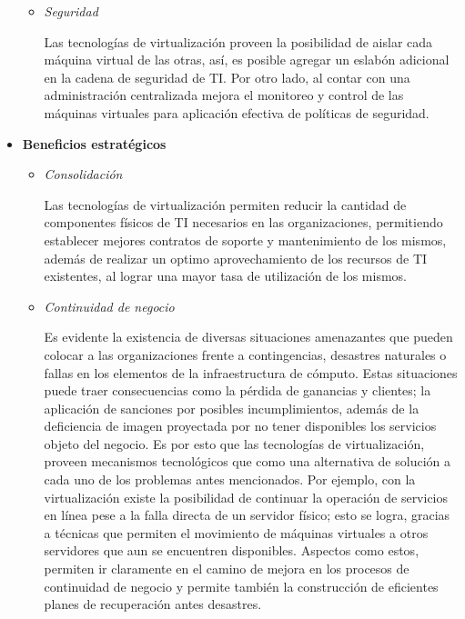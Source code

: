 \begin{itemize}
\begin{itemize}
		\item \textit{Seguridad}\vspace{3mm}
		
		Las tecnologías de virtualización proveen la posibilidad de aislar cada máquina virtual de las otras, así, es posible agregar un eslabón adicional en la cadena de seguridad de TI. Por otro lado, al contar con una administración centralizada mejora el monitoreo y control de las máquinas virtuales para aplicación efectiva de políticas de seguridad.\\
		
	\end{itemize}
	\item \textbf{Beneficios estratégicos}\\
	\begin{itemize}
		
		\item \textit{Consolidación}\vspace{3mm}
		
		Las tecnologías de virtualización permiten reducir la cantidad de componentes físicos de TI necesarios en las organizaciones, permitiendo establecer mejores contratos de soporte y mantenimiento de los mismos, además de realizar un optimo aprovechamiento de los recursos de TI existentes, al lograr una mayor tasa de utilización de los mismos.\\
		
		\item \textit{Continuidad de negocio}\vspace{3mm}
		
		Es evidente la existencia de diversas situaciones amenazantes que pueden colocar a las organizaciones frente a contingencias, desastres naturales o fallas en los elementos de la infraestructura de cómputo. Estas situaciones puede traer consecuencias como la pérdida de ganancias y clientes;  la aplicación de sanciones por posibles incumplimientos, además de la deficiencia de imagen proyectada por no tener disponibles los servicios objeto del negocio. Es por esto que las tecnologías de virtualización, proveen mecanismos tecnológicos que como una alternativa de solución a cada uno de los problemas antes mencionados. Por ejemplo, con la virtualización existe la posibilidad de continuar la operación de servicios en línea pese a la falla directa de un servidor físico; esto se logra, gracias a técnicas que permiten el movimiento de máquinas virtuales a otros servidores que aun se encuentren disponibles. Aspectos como estos, permiten ir claramente en el camino de mejora en los procesos de continuidad de negocio y permite también la construcción de eficientes planes de recuperación antes desastres.\\
		

\end{itemize}
\end{itemize}
